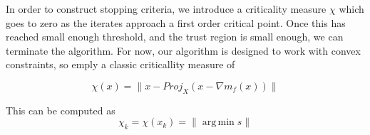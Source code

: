 \documentclass{article}
\newcommand{\domain}{X}
\DeclareMathOperator*{\argmin}{arg\,min}
\begin{document}
In order to construct stopping criteria, we introduce a criticality measure $\chi$ which goes to zero as the iterates approach a first order critical point.
Once this has reached small enough threshold, and the trust region is small enough, we can terminate the algorithm.
For now, our algorithm is designed to work with convex constraints, so emply a classic criticallity measure of

\[
\chi(x) = \|x - Proj_{\domain}(x - \nabla m_f(x))\|
\]

This can be computed as 
\[
\label{critical}

\chi_k = \chi(x_k) = \| \argmin s \|
\]







\end{document}
